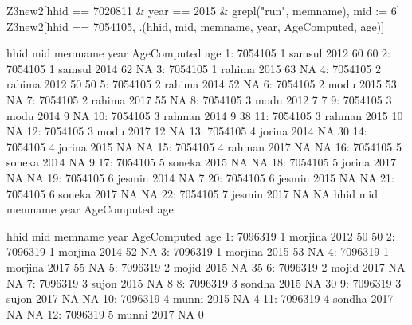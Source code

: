 \begin{Schunk}
\begin{Sinput}
Z3new2[hhid == 7020811 & year == 2015 & grepl("run", memname), mid := 6]
Z3new2[hhid == 7054105, .(hhid, mid, memname, year, AgeComputed, age)]
\end{Sinput}
\begin{Soutput}
       hhid mid memname year AgeComputed age
 1: 7054105   1  samsul 2012          60  60
 2: 7054105   1  samsul 2014          62  NA
 3: 7054105   1  rahima 2015          63  NA
 4: 7054105   2  rahima 2012          50  50
 5: 7054105   2  rahima 2014          52  NA
 6: 7054105   2    modu 2015          53  NA
 7: 7054105   2  rahima 2017          55  NA
 8: 7054105   3    modu 2012           7   7
 9: 7054105   3    modu 2014           9  NA
10: 7054105   3  rahman 2014           9  38
11: 7054105   3  rahman 2015          10  NA
12: 7054105   3    modu 2017          12  NA
13: 7054105   4  jorina 2014          NA  30
14: 7054105   4  jorina 2015          NA  NA
15: 7054105   4  rahman 2017          NA  NA
16: 7054105   5  soneka 2014          NA   9
17: 7054105   5  soneka 2015          NA  NA
18: 7054105   5  jorina 2017          NA  NA
19: 7054105   6  jesmin 2014          NA   7
20: 7054105   6  jesmin 2015          NA  NA
21: 7054105   6  soneka 2017          NA  NA
22: 7054105   7  jesmin 2017          NA  NA
       hhid mid memname year AgeComputed age
\end{Soutput}
\begin{Soutput}
       hhid mid memname year AgeComputed age
 1: 7096319   1 morjina 2012          50  50
 2: 7096319   1 morjina 2014          52  NA
 3: 7096319   1 morjina 2015          53  NA
 4: 7096319   1 morjina 2017          55  NA
 5: 7096319   2   mojid 2015          NA  35
 6: 7096319   2   mojid 2017          NA  NA
 7: 7096319   3   sujon 2015          NA   8
 8: 7096319   3  sondha 2015          NA  30
 9: 7096319   3   sujon 2017          NA  NA
10: 7096319   4   munni 2015          NA   4
11: 7096319   4  sondha 2017          NA  NA
12: 7096319   5   munni 2017          NA   0
\end{Soutput}

\end{Schunk}
